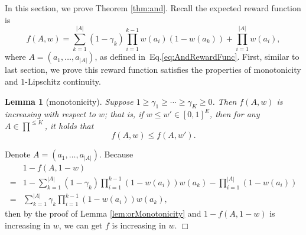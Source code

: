 \documentclass{article}
\newcommand{\abs}[1]{\left| #1 \right|}
\newtheorem{lemma}[theorem]{Lemma}%
\newenvironment{proof}{\noindent {\textbf{Proof. }}}{$\Box$ \medskip}
\begin{document}
In this section, we prove Theorem \ref{thm:and}. Recall the expected reward function is
$$
f(A,w) = \sum_{k = 1}^{\abs{A}} (1 - \gamma_k) \prod_{i = 1}^{k - 1} w(a_i)(1 - w(a_k)) + \prod_{i=1}^{\abs{A}}w(a_i),
$$
where $A = (a_1, \ldots, a_{|A|})$, as defined in~Eq.\eqref{eq:AndRewardFunc}. First, similar to last section, we prove this reward function satisfies the properties of monotonicity and $1$-Lipschitz continuity.

\begin{lemma}[monotonicity]
	\label{lem:andMonotonicity}
	Suppose $1 \geq \gamma_1 \geq \cdots \geq \gamma_K \geq 0$. Then $f(A, w)$ is increasing with respect to $w$; that is, if $w \leq w' \in [0,1]^E$, then for any $A \in \prod^{\leq K}$, it holds that
	$$
	f(A, w) \leq f(A, w').
	$$
\end{lemma}
\begin{proof}
	Denote $A = (a_1, \ldots, a_{|A|})$. Because
	\begin{align*}
	&1 - f(A, 1-w) \\
	=& 1- \sum_{k = 1}^{\abs{A}} (1 - \gamma_k) \prod_{i = 1}^{k - 1} (1-w(a_i))w(a_k) - \prod_{i=1}^{\abs{A}}(1-w(a_i))\\
	=& \sum_{k = 1}^{\abs{A}} \gamma_{k} \prod_{i=1}^{k-1} (1 - w(a_i)) w(a_k),
	\end{align*}
	then by the proof of Lemma \ref{lem:orMonotonicity} and $1-f(A,1-w)$ is increasing in $w$, we can get $f$ is increasing in $w$.
\end{proof}
\end{document}
